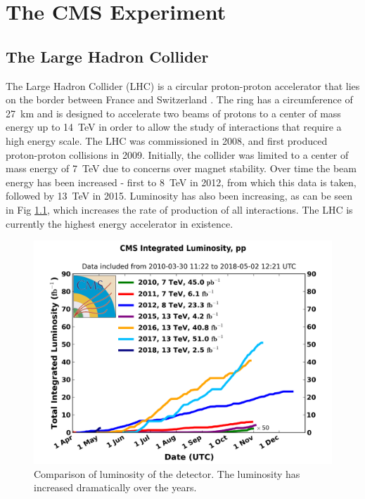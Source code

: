 \chapter{The CMS Experiment}
\label{experiment_chapter}

\section{The Large Hadron Collider}
The Large Hadron Collider (LHC) is a circular proton-proton accelerator that lies on the border between France and Switzerland \cite{LHC_DesignReport}. The ring has a circumference of 27~km and is designed to accelerate two beams of protons to a center of mass energy up to 14~TeV in order to allow the study of interactions that require a high energy scale. The LHC was commissioned in 2008, and first produced proton-proton collisions in 2009. Initially, the collider was limited to a center of mass energy of 7~TeV due to concerns over magnet stability. Over time the beam energy has been increased - first to 8~TeV in 2012, from which this data is taken, followed by 13~TeV in 2015. Luminosity has also been increasing, as can be seen in Fig \ref{fig:CMSLum}, which increases the rate of production of all interactions. The LHC is currently the highest energy accelerator in existence.
\begin{figure}[!htbp]
    \includegraphics[width=\textwidth]{figures/ExperimentFigures/int_lumi_cumulative_pp_2.png}
    \caption[
      Luminosity seen by CMS
    ]{Comparison of luminosity of the detector. The luminosity has increased dramatically over the years.}
    \label{fig:CMSLum}
    
\end{figure}

